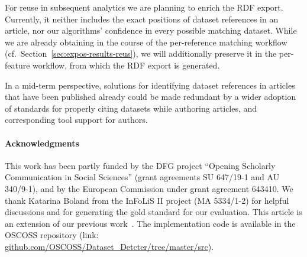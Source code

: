 \documentclass{IOS-Book-Article}
\newcommand{\dara}{\textsf{da\textbar ra}}
\begin{document}

For reuse in subsequent analytics we are planning to enrich the RDF export.
Currently, it neither includes the exact positions of dataset references in an article, nor our algorithms' confidence in every possible matching dataset.
While we are already obtaining in the course of the per-reference matching workflow (cf.\ Section~\ref{sec:expos-results-reus}), we will additionally preserve it in the per-feature workflow, from which the RDF export is generated.

In a mid-term perspective, solutions for identifying dataset references in articles that have been published already could be made redundant by a wider adoption of standards for properly citing datasets while authoring articles, and corresponding tool support for authors.

\paragraph{Acknowledgments}
This work has been partly funded by the DFG project “Opening Scholarly Communication in Social Sciences” 
(grant agreements SU 647/19-1 and AU 340/9-1), and by the European Commission under grant agreement 643410. 
We thank Katarina Boland from the InFoLiS II project (MA 5334/1-2) for helpful discussions and for generating the gold standard for our evaluation. 
This article is an extension of our previous work~\cite{ghavimi2016identifying}.
The implementation code is available in the OSCOSS repository (link: \url{github.com/OSCOSS/Dataset_Detcter/tree/master/src}). 


\end{document}
